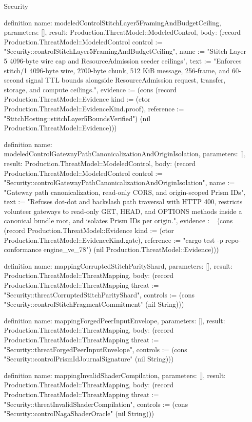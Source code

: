 \begin{lexlean}{Security}
\begin{semanticmodule}
definition{
  name: modeledControlStitchLayer5FramingAndBudgetCeiling,
  parameters: [],
  result: Production.ThreatModel::ModeledControl,
  body: (record Production.ThreatModel::ModeledControl {control := "Security::controlStitchLayer5FramingAndBudgetCeiling", name := "Stitch Layer-5 4096-byte wire cap and ResourceAdmission seeder ceilings", text := "Enforces stitch/1 4096-byte wire, 2700-byte chunk, 512 KiB message, 256-frame, and 60-second signal TTL bounds alongside ResourceAdmission request, transfer, storage, and compute ceilings.", evidence := (cons (record Production.ThreatModel::Evidence {kind := (ctor Production.ThreatModel::EvidenceKind.proof), reference := "StitchHosting::stitchLayer5BoundsVerified"}) (nil Production.ThreatModel::Evidence))})
}

definition{
  name: modeledControlGatewayPathCanonicalizationAndOriginIsolation,
  parameters: [],
  result: Production.ThreatModel::ModeledControl,
  body: (record Production.ThreatModel::ModeledControl {control := "Security::controlGatewayPathCanonicalizationAndOriginIsolation", name := "Gateway path canonicalization, read-only CORS, and origin-scoped Prism IDs", text := "Refuses dot-dot and backslash path traversal with HTTP 400, restricts volunteer gateways to read-only GET, HEAD, and OPTIONS methods inside a canonical bundle root, and isolates Prism IDs per origin.", evidence := (cons (record Production.ThreatModel::Evidence {kind := (ctor Production.ThreatModel::EvidenceKind.gate), reference := "cargo test -p repo-conformance engine_ve_78"}) (nil Production.ThreatModel::Evidence))})
}

definition{
  name: mappingCorruptedStitchParityShard,
  parameters: [],
  result: Production.ThreatModel::ThreatMapping,
  body: (record Production.ThreatModel::ThreatMapping {threat := "Security::threatCorruptedStitchParityShard", controls := (cons "Security::controlStitchFragmentCommitment" (nil String))})
}

definition{
  name: mappingForgedPeerInputEnvelope,
  parameters: [],
  result: Production.ThreatModel::ThreatMapping,
  body: (record Production.ThreatModel::ThreatMapping {threat := "Security::threatForgedPeerInputEnvelope", controls := (cons "Security::controlPrismIdJournalSignature" (nil String))})
}

definition{
  name: mappingInvalidShaderCompilation,
  parameters: [],
  result: Production.ThreatModel::ThreatMapping,
  body: (record Production.ThreatModel::ThreatMapping {threat := "Security::threatInvalidShaderCompilation", controls := (cons "Security::controlNagaShaderOracle" (nil String))})
}


\end{semanticmodule}
\end{lexlean}
